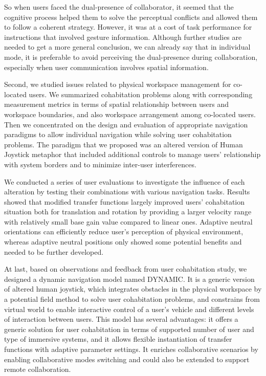 So when users faced the dual-presence of collaborator, it seemed that the cognitive process helped them to solve the perceptual conflicts and allowed them to follow a coherent strategy. However, it was at a cost of task performance for instructions that involved gesture information. Although further studies are needed to get a more general conclusion, we can already say that in individual mode, it is preferable to avoid perceiving the dual-presence during collaboration, especially when user communication involves spatial information.

Second, we studied issues related to physical workspace management for co-located users. We summarized cohabitation problems along with corresponding measurement metrics in terms of spatial relationship between users and workspace boundaries, and also workspace arrangement among co-located users. Then we concentrated on the design and evaluation of appropriate navigation paradigms to allow individual navigation while solving user cohabitation problems. The paradigm that we proposed was an altered version of Human Joystick metaphor that included additional controls to manage users' relationship with system borders and to minimize inter-user interferences.

We conducted a series of user evaluations to investigate the influence of each alteration by testing their combinations with various navigation tasks. Results showed that modified transfer functions largely improved users' cohabitation situation both for translation and rotation by providing a larger velocity range with relatively small base gain value compared to linear ones. Adaptive neutral orientations can efficiently reduce user's perception of physical environment, whereas adaptive neutral positions only showed some potential benefits and needed to be further developed.

At last, based on observations and feedback from user cohabitation study, we designed a dynamic navigation model named DYNAMIC. It is a generic version of altered human joystick, which integrates obstacles in the physical workspace by a potential field method to solve user cohabitation problems, and constrains from virtual world to enable interactive control of a user's vehicle and different levels of interaction between users. This model has several advantages: it offers a generic solution for user cohabitation in terms of supported number of user and type of immersive systems, and it allows flexible instantiation of transfer functions with adaptive parameter settings. It enriches collaborative scenarios by enabling collaborative modes switching and could also be extended to support remote collaboration.

